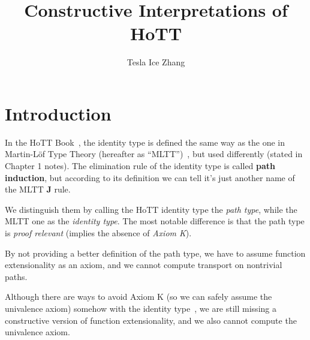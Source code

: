 \documentclass{article}
\title{Constructive Interpretations of HoTT}
\author{Tesla Ice Zhang}
\begin{document}
\maketitle

\tableofcontents

\section{Introduction}

In the HoTT Book~\cite{hottbook},
the identity type is defined the same way as the one
in Martin-L\"{o}f Type Theory (hereafter as ``MLTT'')~\cite{MLTT},
but used differently (stated in Chapter 1 notes).
The elimination rule of the identity type is called \textbf{path induction},
but according to its definition we can tell
it's just another name of the MLTT \textbf J rule.

We distinguish them by calling the HoTT identity type the \textit{path type},
while the MLTT one as the \textit{identity type}.
The most notable difference is that the path type is
\textit{proof relevant} (implies the absence of \textit{Axiom K}).

By not providing a better definition of the path type,
we have to assume function extensionality as an axiom,
and we cannot compute transport on nontrivial paths.

Although there are ways to avoid Axiom K
(so we can safely assume the univalence axiom)
somehow with the identity type~\cite{WithoutK},
we are still missing a constructive version of function extensionality,
and we also cannot compute the univalence axiom.



\end{document}
